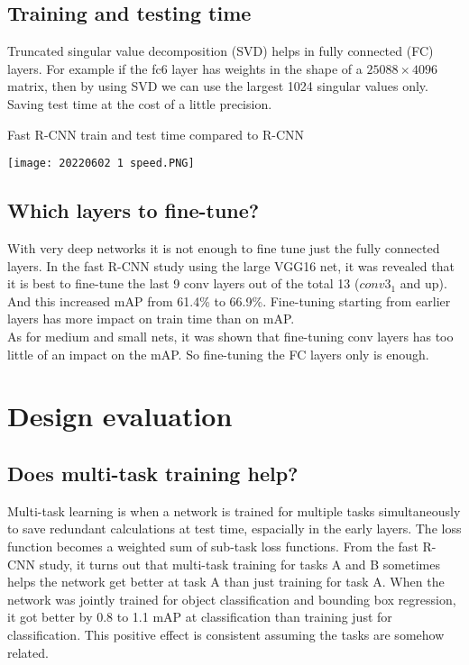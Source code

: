 \documentclass[10pt]{article}
\begin{document}
\subsection{Training and testing time}

Truncated singular value decomposition (SVD) helps in fully connected (FC) layers. For example if the fc6 layer has weights in the shape of a $25088\times4096$ matrix, then by using SVD we can use the largest 1024 singular values only. Saving test time at the cost of a little precision.

\begin{center}
\begin{table}
\caption{Fast R-CNN train and test time compared to R-CNN}
\texttt{[image: 20220602 1 speed.PNG]}
\end{table}
\end{center}

\subsection{Which layers to fine-tune?}
With very deep networks it is not enough to fine tune just the fully connected layers. In the fast R-CNN study using the large VGG16 net, it was revealed that it is best to fine-tune the last 9 conv layers out of the total 13 ($conv3_1$ and up). And this increased mAP from 61.4\% to 66.9\%. Fine-tuning starting from earlier layers has more impact on train time than on mAP.\\
As for medium and small nets, it was shown that fine-tuning conv layers has too little of an impact on the mAP. So fine-tuning the FC layers only is enough.


\section{Design evaluation}

\subsection{Does multi-task training help?}
Multi-task learning is when a network is trained for multiple tasks simultaneously to save redundant calculations at test time, espacially in the early layers. The loss function becomes a weighted sum of sub-task loss functions. From the fast R-CNN study, it turns out that multi-task training for tasks A and B sometimes helps the network get better at task A than just training for task A. When the network was jointly trained for object classification and bounding box regression, it got better by 0.8 to 1.1 mAP at classification than training just for classification. This positive effect is consistent assuming the tasks are somehow related.
\end{document}
